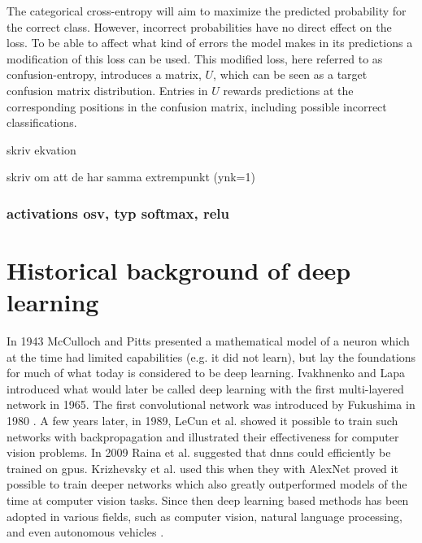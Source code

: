 The categorical cross-entropy will aim to maximize the predicted probability for the correct class. However, incorrect probabilities have no direct effect on the loss. To be able to affect what kind of errors the model makes in its predictions a modification of this loss can be used. This modified loss, here referred to as confusion-entropy, introduces a matrix, $U$, which can be seen as a target confusion matrix distribution. Entries in $U$ rewards predictions at the corresponding positions in the confusion matrix, including possible incorrect classifications.

skriv ekvation

skriv om att de har samma extrempunkt (ynk=1)



\subsubsection{activations osv, typ softmax, relu}




\section{Historical background of deep learning} \label{sec:dl-history}
In 1943 McCulloch and Pitts \cite{McCulloch1943} presented a mathematical model of a neuron which at the time had limited capabilities (e.g. it did not learn), but lay the foundations for much of what today is considered to be deep learning. Ivakhnenko and Lapa \cite{Ivakhnenko1965} introduced what would later be called deep learning with the first multi-layered network in 1965. The first convolutional network was introduced by Fukushima in 1980 \cite{Fukushima1980}. A few years later, in 1989, LeCun et al. \cite{LeCun1989} showed it possible to train such networks with backpropagation and illustrated their effectiveness for computer vision problems. In 2009 Raina et al. \cite{Raina2009} suggested that \glspl{dnn} could efficiently be trained on \glspl{gpu}. Krizhevsky et al. \cite{Krizhevsky2012} used this when they with AlexNet proved it possible to train deeper networks which also greatly outperformed models of the time at computer vision tasks. Since then deep learning based methods has been adopted in various fields, such as computer vision, natural language processing, and even autonomous vehicles \cite{NazmusSaadat2020}.

